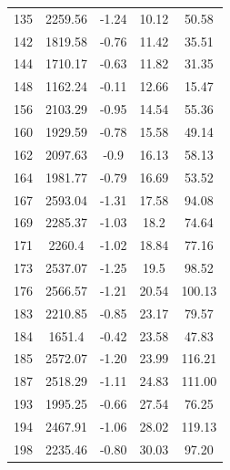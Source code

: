 {\begin{longtable}{ccccc}
135 & 2259.56 & -1.24 & 10.12 & 50.58 \\
142 & 1819.58 & -0.76 & 11.42 & 35.51 \\
144 & 1710.17 & -0.63 & 11.82 & 31.35 \\
148 & 1162.24 & -0.11 & 12.66 & 15.47 \\
156 & 2103.29 & -0.95 & 14.54 & 55.36 \\
160 & 1929.59 & -0.78 & 15.58 & 49.14 \\
162 & 2097.63 & -0.9 & 16.13 & 58.13 \\
164 & 1981.77 & -0.79 & 16.69 & 53.52 \\
167 & 2593.04 & -1.31 & 17.58 & 94.08 \\
169 & 2285.37 & -1.03 & 18.2 & 74.64 \\
171 & 2260.4 & -1.02 & 18.84 & 77.16 \\
173 & 2537.07 & -1.25 & 19.5 & 98.52 \\
176 & 2566.57 & -1.21 & 20.54 & 100.13 \\
183 & 2210.85 & -0.85 & 23.17 & 79.57 \\
184 & 1651.4 & -0.42 & 23.58 & 47.83 \\
185 & 2572.07 & -1.20 & 23.99 & 116.21 \\
187 & 2518.29 & -1.11 & 24.83 & 111.00 \\
193 & 1995.25 & -0.66 & 27.54 & 76.25 \\
194 & 2467.91 & -1.06 & 28.02 & 119.13 \\
198 & 2235.46 & -0.80 & 30.03 & 97.20 \\ \hline
\end{longtable}
}
